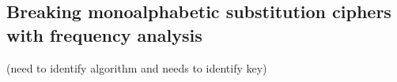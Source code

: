 
\subsection{Breaking monoalphabetic substitution ciphers with frequency analysis}

(need to identify algorithm and needs to identify key)

